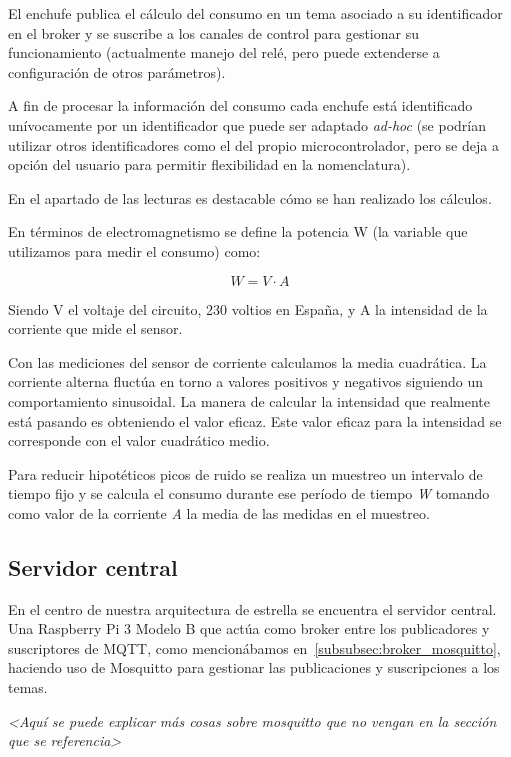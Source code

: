 \documentclass[a4paper,10pt]{article}
\begin{document}
El enchufe publica el cálculo del consumo en un tema asociado a su
identificador en el broker y se suscribe a los canales de control para
gestionar su funcionamiento (actualmente manejo del relé, pero puede
extenderse a configuración de otros parámetros).

A fin de procesar la información del consumo cada enchufe está
identificado unívocamente por un identificador que puede ser adaptado
\textit{ad-hoc} (se podrían utilizar otros identificadores como el del propio
microcontrolador, pero se deja a opción del usuario para permitir
flexibilidad en la nomenclatura).

En el apartado de las lecturas es destacable cómo se han realizado los
cálculos.

En términos de electromagnetismo se define la potencia W (la variable
que utilizamos para medir el consumo) como:

\[W = V\cdot A\]

Siendo V el voltaje del circuito, 230 voltios en España, y A la
intensidad de la corriente que mide el sensor.

Con las mediciones del sensor de corriente calculamos la
media cuadrática. La corriente alterna fluctúa en torno a valores
positivos y negativos siguiendo un comportamiento sinusoidal. La
manera de calcular la intensidad que realmente está pasando es
obteniendo el valor eficaz. Este valor eficaz para la intensidad se
corresponde con el valor cuadrático
medio\cite{alcaldesanmiguelElectrotecniaInstalacionesElectricas2014}.

Para reducir hipotéticos picos de ruido se realiza un muestreo un
intervalo de tiempo fijo y se calcula el consumo durante ese período
de tiempo \textit{W} tomando como valor de la corriente \textit{A} la
media de las medidas en el muestreo.

\newpage

\subsection{Servidor central}\label{subsec:servidor-central}

En el centro de nuestra arquitectura de estrella se encuentra el
servidor central. Una Raspberry Pi 3 Modelo B que actúa como broker
entre los publicadores y suscriptores de MQTT, como mencionábamos
en~\ref{subsubsec:broker_mosquitto}, haciendo uso de Mosquitto para
gestionar las publicaciones y suscripciones a los temas.

\textit{\textless Aquí se puede explicar más cosas sobre mosquitto que
  no vengan en la sección que se referencia\textgreater}
\end{document}
